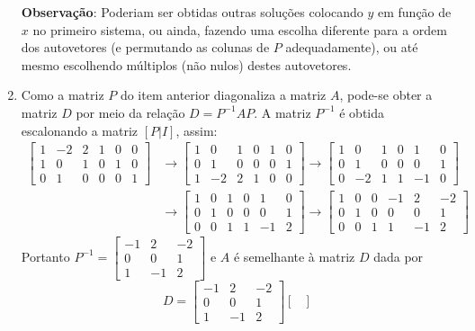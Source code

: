 \documentclass[12pt,a4paper]{article}
\begin{document}
\begin{ExerciseList}
\begin{enumerate}
\textbf{Observação}: Poderiam ser obtidas outras soluções colocando $y$ em função de $x$ no primeiro sistema, ou ainda, fazendo uma escolha diferente para a ordem dos autovetores (e permutando as colunas de $P$ adequadamente), ou até mesmo escolhendo múltiplos (não nulos) destes autovetores.
\item Como a matriz $P$ do item anterior diagonaliza a matriz $A$, pode-se obter a matriz $D$ por meio da relação $D = P^{-1} A P$. A matriz $P^{-1}$ é obtida escalonando a matriz $[P | I]$, assim:
\begin{align*}
\begin{bmatrix}
1 & -2 & 2 & 1 & 0 & 0\\
1 &  0 & 1 & 0 & 1 & 0\\
0 &  1 & 0 & 0 & 0 & 1
\end{bmatrix}
& \rightarrow
\begin{bmatrix}
1 &  0 & 1 & 0 & 1 & 0\\
0 &  1 & 0 & 0 & 0 & 1\\
1 & -2 & 2 & 1 & 0 & 0
\end{bmatrix}
\rightarrow
\begin{bmatrix}
1 &  0 & 1 & 0 &  1 & 0\\
0 &  1 & 0 & 0 &  0 & 1\\
0 & -2 & 1 & 1 & -1 & 0
\end{bmatrix}\\
&\rightarrow
\begin{bmatrix}
1 & 0 & 1 & 0 &  1 & 0\\
0 & 1 & 0 & 0 &  0 & 1\\
0 & 0 & 1 & 1 & -1 & 2
\end{bmatrix}
\rightarrow
\begin{bmatrix}
1 & 0 & 0 & -1 &  2 & -2\\
0 & 1 & 0 &  0 &  0 &  1\\
0 & 0 & 1 &  1 & -1 &  2
\end{bmatrix}
\end{align*}
Portanto $P^{-1} =
\begin{bmatrix}
-1 &  2 & -2\\
 0 &  0 &  1\\
 1 & -1 &  2
\end{bmatrix}$
e $A$ é semelhante à matriz $D$ dada por
\[
D
=
\begin{bmatrix}
-1 &  2 & -2\\
 0 &  0 &  1\\
 1 & -1 &  2
\end{bmatrix}
\begin{bmatrix}

\end{bmatrix}\]
\end{enumerate}
\end{ExerciseList}
\end{document}
